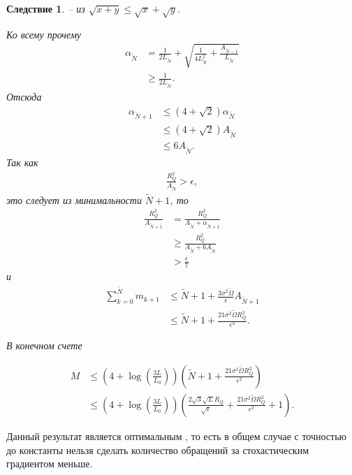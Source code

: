 \documentclass[11pt,a4]{article}
\newtheorem{corollary}{Следствие}
\newcommand*\circled[1]{\tikz[baseline=(char.base)]{
		\node[shape=circle,draw,inner sep=2pt] (char) {#1};}}
\begin{document}
\begin{corollary}
{\small \circled{1}} -- из $\sqrt{x + y} \leq \sqrt{x} + \sqrt{y}$.

Ко всему прочему
\begin{align*}
\alpha_{\widetilde{N}} &= \frac{1}{2L_{\widetilde{N}}} + \sqrt{\frac{1}{4L_{\widetilde{N}}^2} + \frac{A_{\widetilde{N} - 1}}{L_{\widetilde{N}}}} \\&\geq \frac{1}{2L_{\widetilde{N}}}.
\end{align*}
Отсюда
\begin{align*}
\alpha_{\widetilde{N} + 1} &\leq (4 + \sqrt{2})\alpha_{\widetilde{N}} \\&\leq (4 + \sqrt{2})A_{\widetilde{N}} \\&\leq 6A_{\widetilde{N}}.
\end{align*}
Так как \begin{align*}\frac{R_Q^2}{A_{\widetilde{N}}} > \epsilon,\end{align*} это следует из минимальности $\widetilde{N} + 1$, то \begin{align*}\frac{R_Q^2}{A_{\widetilde{N} + 1}} &= \frac{R_Q^2}{A_{\widetilde{N}} + \alpha_{\widetilde{N} + 1}} \\&\geq \frac{R_Q^2}{A_{\widetilde{N}} + 6A_{\widetilde{N}}} \\&> \frac{\epsilon}{7}\end{align*}
и
\begin{align*}
\sum_{k=0}^{\widetilde{N}}m_{k+1} &\leq {\widetilde{N} + 1} + \frac{3\sigma^2\widetilde{\Omega}}{\epsilon}A_{\widetilde{N} + 1} \\&\leq {\widetilde{N} + 1} + \frac{21\sigma^2\widetilde{\Omega}R_Q^2}{\epsilon^2}.
\end{align*}

В конечном счете

\begin{align*}
M  &\leq \left(4 + \log\left(\frac{3L}{L_0}\right)\right)\left({\widetilde{N} + 1} + \frac{21\sigma^2\widetilde{\Omega}R_Q^2}{\epsilon^2}\right) \\&\leq
\left(4 + \log\left(\frac{3L}{L_0}\right)\right)\left(\frac{2\sqrt{3}\sqrt{L}R_Q}{\sqrt{\epsilon}} + \frac{21\sigma^2\widetilde{\Omega}R_Q^2}{\epsilon^2} + 1\right).
\end{align*}
\end{corollary}

Данный результат является оптимальным \cite{lan2012optimal}, то есть в общем случае с точностью до константы нельзя сделать количество обращений за стохастическим градиентом меньше.
\end{document}
